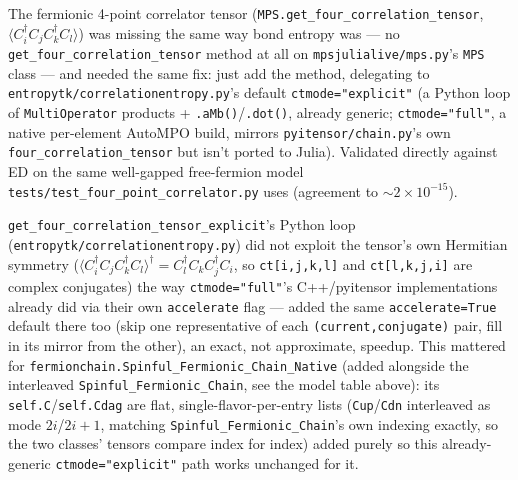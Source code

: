 \documentclass[11pt]{article}
\begin{document}
The fermionic 4-point correlator tensor
(\texttt{MPS.get\_four\_correlation\_tensor}, $\langle
C^\dagger_i C_j C^\dagger_k C_l \rangle$) was missing the same way bond
entropy was --- no \texttt{get\_four\_correlation\_tensor} method at all
on \texttt{mpsjulialive/mps.py}'s \texttt{MPS} class --- and needed the
same fix: just add the method, delegating to
\texttt{entropytk/correlationentropy.py}'s default
\texttt{ctmode="explicit"} (a Python loop of \texttt{MultiOperator}
products + \texttt{.aMb()}/\texttt{.dot()}, already generic;
\texttt{ctmode="full"}, a native per-element AutoMPO build, mirrors
\texttt{pyitensor/chain.py}'s own \texttt{four\_correlation\_tensor} but
isn't ported to Julia). Validated directly against ED on the same
well-gapped free-fermion model \texttt{tests/test\_four\_point\_correlator.py}
uses (agreement to $\sim 2 \times 10^{-15}$).

\texttt{get\_four\_correlation\_tensor\_explicit}'s Python loop
(\texttt{entropytk/correlationentropy.py}) did not exploit the tensor's
own Hermitian symmetry ($\langle C^\dagger_i C_j C^\dagger_k
C_l\rangle^\dagger = C^\dagger_l C_k C^\dagger_j C_i$, so
\texttt{ct[i,j,k,l]} and \texttt{ct[l,k,j,i]} are complex conjugates)
the way \texttt{ctmode="full"}'s C++/pyitensor implementations already
did via their own \texttt{accelerate} flag --- added the same
\texttt{accelerate=True} default there too (skip one representative of
each \texttt{(current,conjugate)} pair, fill in its mirror from the
other), an exact, not approximate, speedup. This mattered for
\texttt{fermionchain.Spinful\_Fermionic\_Chain\_Native} (added
alongside the interleaved \texttt{Spinful\_Fermionic\_Chain}, see the
model table above): its \texttt{self.C}/\texttt{self.Cdag} are flat,
single-flavor-per-entry lists (\texttt{Cup}/\texttt{Cdn} interleaved as
mode $2i$/$2i+1$, matching \texttt{Spinful\_Fermionic\_Chain}'s own
indexing exactly, so the two classes' tensors compare index for index)
added purely so this already-generic \texttt{ctmode="explicit"} path
works unchanged for it.
\end{document}
